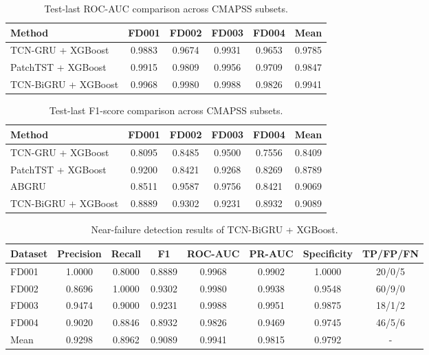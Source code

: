 \begin{table}[!t]
\centering
\caption{Test-last ROC-AUC comparison across CMAPSS subsets.}
\label{tab:method\_comparison\_auc}
\begin{tabular}{lccccc}
\hline
Method & FD001 & FD002 & FD003 & FD004 & Mean \\
\hline
TCN-GRU + XGBoost & 0.9883 & 0.9674 & 0.9931 & 0.9653 & 0.9785 \\
PatchTST + XGBoost & 0.9915 & 0.9809 & 0.9956 & 0.9709 & 0.9847 \\
TCN-BiGRU + XGBoost & 0.9968 & 0.9980 & 0.9988 & 0.9826 & 0.9941 \\
\hline
\end{tabular}
\end{table}

\begin{table}[!t]
\centering
\caption{Test-last F1-score comparison across CMAPSS subsets.}
\label{tab:method\_comparison\_f1}
\begin{tabular}{lccccc}
\hline
Method & FD001 & FD002 & FD003 & FD004 & Mean \\
\hline
TCN-GRU + XGBoost & 0.8095 & 0.8485 & 0.9500 & 0.7556 & 0.8409 \\
PatchTST + XGBoost & 0.9200 & 0.8421 & 0.9268 & 0.8269 & 0.8789 \\
ABGRU & 0.8511 & 0.9587 & 0.9756 & 0.8421 & 0.9069 \\
TCN-BiGRU + XGBoost & 0.8889 & 0.9302 & 0.9231 & 0.8932 & 0.9089 \\
\hline
\end{tabular}
\end{table}

\begin{table}[!t]
\centering
\caption{Near-failure detection results of TCN-BiGRU + XGBoost.}
\label{tab:proposed\_results}
\begin{tabular}{lccccccc}
\hline
Dataset & Precision & Recall & F1 & ROC-AUC & PR-AUC & Specificity & TP/FP/FN \\
\hline
FD001 & 1.0000 & 0.8000 & 0.8889 & 0.9968 & 0.9902 & 1.0000 & 20/0/5 \\
FD002 & 0.8696 & 1.0000 & 0.9302 & 0.9980 & 0.9938 & 0.9548 & 60/9/0 \\
FD003 & 0.9474 & 0.9000 & 0.9231 & 0.9988 & 0.9951 & 0.9875 & 18/1/2 \\
FD004 & 0.9020 & 0.8846 & 0.8932 & 0.9826 & 0.9469 & 0.9745 & 46/5/6 \\
Mean & 0.9298 & 0.8962 & 0.9089 & 0.9941 & 0.9815 & 0.9792 & - \\
\hline
\end{tabular}
\end{table}

